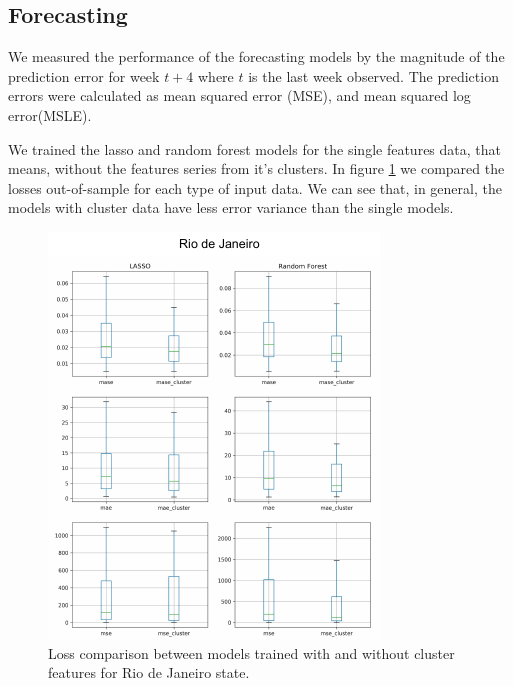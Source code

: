\documentclass[12pt]{report}
\begin{document}
\subsection{Forecasting}
We measured the performance of the forecasting models by the magnitude of the prediction error for week $t+4$ where $t$ is the last week observed. The prediction errors were calculated as mean squared error (MSE), and mean squared log error(MSLE).

We trained the lasso and random forest models for the single features data, that means, without the features series from it's clusters. In figure \ref{fig:cluster_compar_rj} we compared the losses out-of-sample for each type of input data. We
can see that, in general, the models with cluster data have less error variance than the single models.

\begin{figure}[!ht]
\centering
\includegraphics[width=\textwidth]{cluster_model_compar_RJ.pdf}
\caption{Loss comparison between models trained with and without cluster features for Rio de Janeiro state.}
\label{fig:cluster_compar_rj}
\end{figure}
\end{document}
